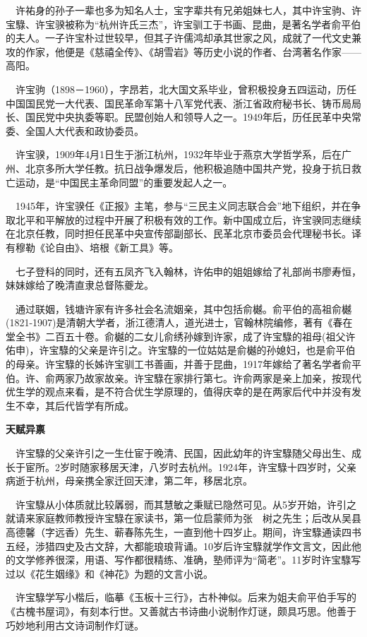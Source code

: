 \begin{frame}
	$\quad$许祐身的孙子一辈也多为知名人士，宝字辈共有兄弟姐妹七人，其中许宝驹、许宝騄、许宝骙被称为“杭州许氏三杰”，许宝驯工于书画、昆曲，是著名学者俞平伯的夫人。一子许宝朴过世较早，但其子许儒鸿却承其世家之风，成就了一代文史兼攻的作家，他便是《慈禧全传》、《胡雪岩》等历史小说的作者、台湾著名作家——高阳。
	
	$\quad$许宝驹（1898－1960），字昂若，北大国文系毕业，曾积极投身五四运动，历任中国国民党一大代表、国民革命军第十八军党代表、浙江省政府秘书长、铸币局局长、国民党中央执委等职。民盟创始人和领导人之一。1949年后，历任民革中央常委、全国人大代表和政协委员。
	
	$\quad$许宝骙，1909年4月1日生于浙江杭州，1932年毕业于燕京大学哲学系，后在广州、北京多所大学任教。抗日战争爆发后，他积极追随中国共产党，投身于抗日救亡运动，是“中国民主革命同盟”的重要发起人之一。
\end{frame}

\begin{frame}
	$\quad$1945年，许宝骙任《正报》主笔，参与“三民主义同志联合会”地下组织，并在争取北平和平解放的过程中开展了积极有效的工作。新中国成立后，许宝骙同志继续在北京任教，同时担任民革中央宣传部副部长、民革北京市委员会代理秘书长。译有穆勒《论自由》、培根《新工具》等。
	
	$\quad$七子登科的同时，还有五凤齐飞入翰林，许佑申的姐姐嫁给了礼部尚书廖寿恒，妹妹嫁给了晚清直隶总督陈夔龙。
	
	$\quad$通过联姻，钱塘许家有许多社会名流姻亲，其中包括俞樾。俞平伯的高祖俞樾(1821-1907)是清朝大学者，浙江德清人，道光进士，官翰林院编修，著有《春在堂全书》二百五十卷。俞樾的二女儿俞绣孙嫁到许家，成了许宝騄的祖母(祖父许佑申)，许宝騄的父亲是许引之。许宝騄的一位姑姑是俞樾的孙媳妇，也是俞平伯的母亲。许宝騄的长姊许宝驯工书善画，并善于昆曲，1917年嫁给了著名学者俞平伯。许、俞两家乃故家故亲。许宝騄在家排行第七。许俞两家是亲上加亲，按现代优生学的观点来看，是不符合优生学原理的，值得庆幸的是在两家后代中并没有发生不幸，其后代皆学有所成。
\end{frame}

\begin{frame}
	\textbf{天赋异禀}
	
	$\quad$许宝騄的父亲许引之一生仕宦于晚清、民国，因此幼年的许宝騄随父母出生、成长于宦所。2岁时随家移居天津，八岁时去杭州。1924年，许宝騄十四岁时，父亲病逝于杭州，母亲携全家迁回天津，第二年，移居北京。
	
	$\quad$许宝騄从小体质就比较羼弱，而其慧敏之秉赋已隐然可见。从5岁开始，许引之就请来家庭教师教授许宝騄在家读书，第一位启蒙师为张　树之先生；后改从吴县高德馨（字远香）先生、蕲春陈先生，一直到他十四岁止。期间，许宝騄通读四书五经，涉猎四史及古文辞，大都能琅琅背诵。10岁后许宝騄就学作文言文，因此他的文学修养很深，用语、写作都很精练、准确，塾师评为“简老”。11岁时许宝騄写过以《花生姻缘》和《神花》为题的文言小说。
	
	$\quad$许宝騄学写小楷后，临摹《玉板十三行》，古朴神似。后来为姐夫俞平伯手写的《古槐书屋词》，有刻本行世。又善就古书诗曲小说制作灯谜，颇具巧思。他善于巧妙地利用古文诗词制作灯谜。
\end{frame}

